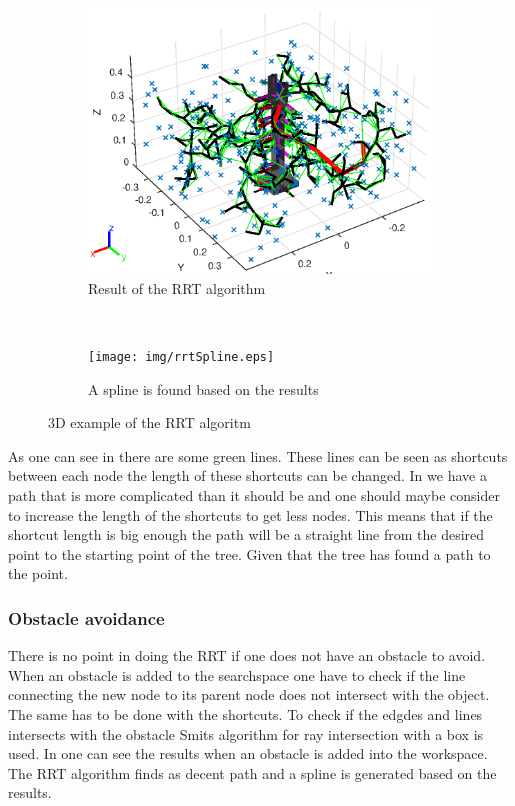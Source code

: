 \def\picsSiz{1.08}
\begin{figure}[htbp]
    \centering
    \begin{subfigure}[htbp]{0.45\textwidth}
        \centering
        \includegraphics[width = \picsSiz\linewidth]{img/rrt3dex.eps}
        \caption{Result of the RRT algorithm}
        \label{fig:rrt3dex}
    \end{subfigure}
    ~ 
    \begin{subfigure}[htbp]{0.45\textwidth}
        \centering
        \texttt{[image: img/rrtSpline.eps]}
        \caption{A spline is found based on the results}
        \label{fig:rrtSpline}
    \end{subfigure}
    \caption{3D example of the RRT algoritm}
    \label{fig:rrtsuper}
\end{figure}
 As one can see in  there are some green lines. These lines can be seen as shortcuts between each node the length of these shortcuts can be changed. In  we have a path that is more complicated than it should be and one should maybe consider to increase the length of the shortcuts to get less nodes. This means that if the shortcut length is big enough the path will be a straight line from the desired point to the starting point of the tree. Given that the tree has found a path to the point. 
 
 \subsubsection{Obstacle avoidance}
 There is no point in doing the RRT if one does not have an obstacle to avoid. When an obstacle is added to the searchspace one have to check if the line connecting the new node to its parent node does not intersect with the object. The same has to be done with the shortcuts. To check if the edgdes and lines intersects with the obstacle Smits algorithm for ray intersection with a box is used\cite{Smits,Intersection}. In  one can see the results when an obstacle is added into the workspace. The RRT algorithm finds as decent path and a spline is generated based on the results. 


